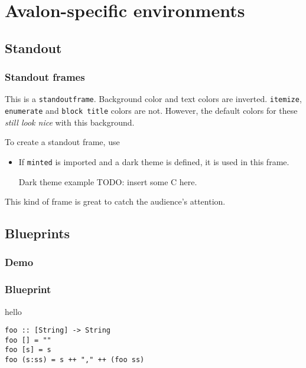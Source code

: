 \documentclass[aspectratio=169]{beamer}
\begin{document}
\makeatletter
\makeatother
\section{Avalon-specific environments}
\subsection{Standout}
\begin{frame}[standout]
  \frametitle{Standout frames}
  This is a \texttt{standoutframe}. Background color and text colors are inverted.
  \texttt{itemize}, \texttt{enumerate} and \texttt{block title} colors are not.
  However, the default colors for these \emph{still look nice} with this background.

  \begin{block}{}
    To create a standout frame, use
  \end{block}

  \begin{itemize}
  \item If \texttt{minted} is imported and a dark theme is defined, it is used in this
    frame.
    \begin{exampleblock}{Dark theme example}
      TODO: insert some C here.
    \end{exampleblock}
  \end{itemize}

  This kind of frame is great to catch the audience's attention.

\end{frame}



\subsection{Blueprints}
\subsubsection{Demo}
  \makeatletter
  \def\avalon@blueprint{1}
  \makeatother
\begin{frame}[fragile]
  \frametitle{Blueprint}
  hello
\begin{verbatim}
foo :: [String] -> String
foo [] = ""
foo [s] = s
foo (s:ss) = s ++ "," ++ (foo ss)
\end{verbatim}
\end{frame}
  \makeatletter
  \undef\avalon@blueprint
  \makeatother
\end{document}

